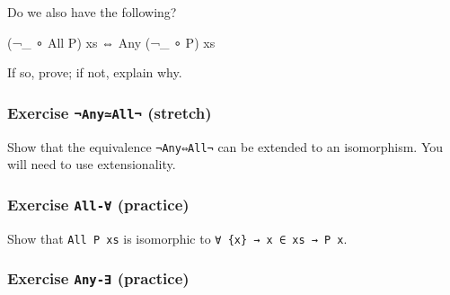 Do we also have the following?

\begin{myDisplay}
(¬_ ∘ All P) xs ⇔ Any (¬_ ∘ P) xs
\end{myDisplay}

If so, prove; if not, explain why.

\begin{fence}
\begin{code}%
\>[0]\<%
\end{code}
\end{fence}

\hypertarget{exercise-anyall-stretch}{%
\subsubsection{\texorpdfstring{Exercise \texttt{¬Any≃All¬}
(stretch)}{Exercise ¬Any≃All¬ (stretch)}}\label{exercise-anyall-stretch}}

Show that the equivalence \texttt{¬Any⇔All¬} can be extended to an
isomorphism. You will need to use extensionality.

\begin{fence}
\begin{code}%
\>[0]\<%
\end{code}
\end{fence}

\hypertarget{exercise-all--practice}{%
\subsubsection{\texorpdfstring{Exercise \texttt{All-∀}
(practice)}{Exercise All-∀ (practice)}}\label{exercise-all--practice}}

Show that \texttt{All\ P\ xs} is isomorphic to
\texttt{∀\ \{x\}\ →\ x\ ∈\ xs\ →\ P\ x}.

\begin{fence}
\begin{code}%
\>[0]\<%
\end{code}
\end{fence}

\hypertarget{exercise-any--practice}{%
\subsubsection{\texorpdfstring{Exercise \texttt{Any-∃}
(practice)}{Exercise Any-∃ (practice)}}\label{exercise-any--practice}}

